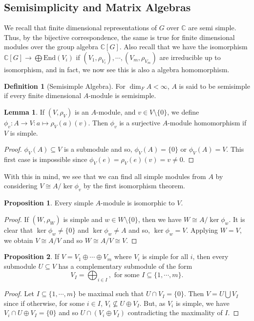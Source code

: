 \documentclass[]{article}
\theoremstyle{definition}
\theoremstyle{definition}
\newtheorem{definition}{Definition}[section]
\newtheorem{lemma}{Lemma}[section]
\newtheorem{proposition}{Proposition}[section]
\begin{document}
\subsection{Semisimplicity and Matrix Algebras}

We recall that finite dimensional representations of \(G\) over \(\mathbb{C}\) 
are semi simple. Thus, by the bijective correspondence, the same is true 
for finite dimensional modules over the group algebra \(\mathbb{C}[G]\).
Also recall that we have the isomorphism 
\(\mathbb{C}[G] \to \bigoplus \text{End}(V_i)\) if \((V_1, \rho_{V_i}), \cdots, 
(V_m, \rho_{V_m})\) are irreducible up to isomorphism, and in fact, we 
now see this is also a algebra homomorphism.

\begin{definition}[Semisimple Algebra]
  For \(\dim_F A < \infty\), \(A\) is said to be semisimple if 
  every finite dimensional \(A\)-module is semisimple.
\end{definition}

\begin{lemma}
  If \((V, \rho_V)\) is an \(A\)-module, and \(v \in V \setminus \{0\}\), we 
  define \(\phi_v : A \to V : a \mapsto \rho_V(a)(v)\). Then \(\phi_v\) is a 
  surjective \(A\)-module homomorphism if \(V\) is simple.
\end{lemma}
\begin{proof}
  \(\phi_V(A) \subseteq V\) is a submodule and so, \(\phi_V(A) = \{0\}\) or 
  \(\phi_V(A) = V\). This first case is impossible since \(\phi_V(e) = 
  \rho_V(e)(v) = v \neq 0\).
\end{proof}

With this in mind, we see that we can find all simple modules from \(A\) by 
considering \(V \cong A / \ker \phi_v\) by the first isomorphism theorem.

\begin{proposition}
  Every simple \(A\)-module is isomorphic to \(V\).
\end{proposition}
\begin{proof}
  If \((W, \rho_W)\) is simple and \(w \in W \setminus \{0\}\), then 
  we have \(W \cong A / \ker \phi_w\). It is clear that \(\ker \phi_w \neq \{0\}\) 
  and \(\ker \phi_w \neq A\) and so, \(\ker \phi_w = V\). Applying 
  \(W = V\), we obtain \(V \cong A / V\) and so \(W \cong A / V \cong V\).
\end{proof}

\begin{proposition}
  If \(V = V_1 \oplus \cdots \oplus V_m\) where \(V_i\) is simple for all \(i\), 
  then every submodule \(U \subseteq V\) has a complementary submodule of the 
  form 
  \[V_I = \bigoplus_{i \in I}, \text{ for some } I \subseteq \{1, \cdots, m\}.\]
\end{proposition}
\begin{proof}
  Let \(I \subseteq \{1, \cdots, m\}\) be maximal such that \(U \cap V_I = \{0\}\). 
  Then \(V = U \bigcup V_I\) since if otherwise, for some \(i \in I\), 
  \(V_i \not\subseteq U \oplus V_I\). But, as \(V_i\) is simple, we have
  \(V_i \cap U \oplus V_I = \{0\}\) and so \(U \cap (V_i \oplus V_I)\) contradicting 
  the maximality of \(I\).
\end{proof}
\end{document}
